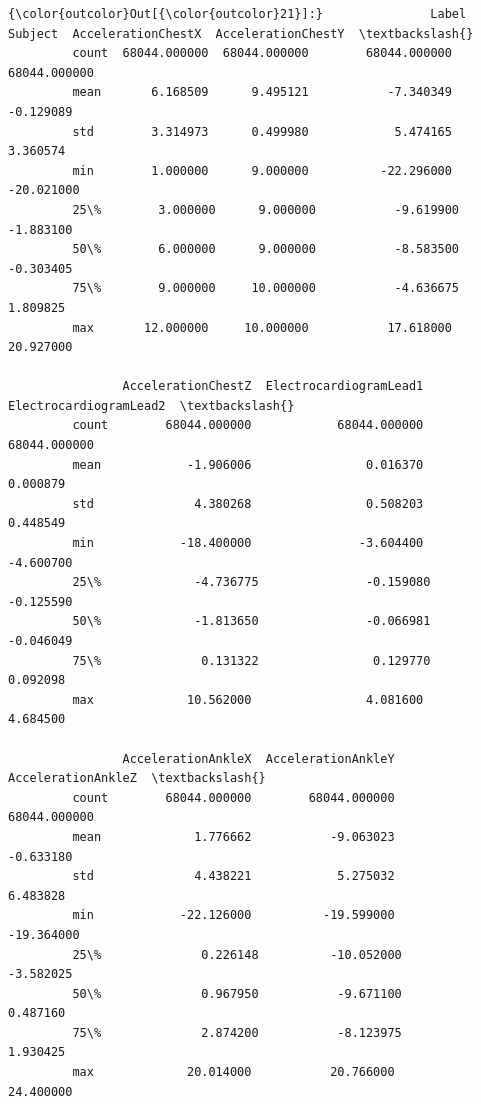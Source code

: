 \documentclass[11pt]{article}
\begin{document}
\begin{Verbatim}[commandchars=\\\{\}]
{\color{outcolor}Out[{\color{outcolor}21}]:}               Label       Subject  AccelerationChestX  AccelerationChestY  \textbackslash{}
         count  68044.000000  68044.000000        68044.000000        68044.000000   
         mean       6.168509      9.495121           -7.340349           -0.129089   
         std        3.314973      0.499980            5.474165            3.360574   
         min        1.000000      9.000000          -22.296000          -20.021000   
         25\%        3.000000      9.000000           -9.619900           -1.883100   
         50\%        6.000000      9.000000           -8.583500           -0.303405   
         75\%        9.000000     10.000000           -4.636675            1.809825   
         max       12.000000     10.000000           17.618000           20.927000   
         
                AccelerationChestZ  ElectrocardiogramLead1  ElectrocardiogramLead2  \textbackslash{}
         count        68044.000000            68044.000000            68044.000000   
         mean            -1.906006                0.016370                0.000879   
         std              4.380268                0.508203                0.448549   
         min            -18.400000               -3.604400               -4.600700   
         25\%             -4.736775               -0.159080               -0.125590   
         50\%             -1.813650               -0.066981               -0.046049   
         75\%              0.131322                0.129770                0.092098   
         max             10.562000                4.081600                4.684500   
         
                AccelerationAnkleX  AccelerationAnkleY  AccelerationAnkleZ  \textbackslash{}
         count        68044.000000        68044.000000        68044.000000   
         mean             1.776662           -9.063023           -0.633180   
         std              4.438221            5.275032            6.483828   
         min            -22.126000          -19.599000          -19.364000   
         25\%              0.226148          -10.052000           -3.582025   
         50\%              0.967950           -9.671100            0.487160   
         75\%              2.874200           -8.123975            1.930425   
         max             20.014000           20.766000           24.400000   
         

\end{Verbatim}
\end{document}
